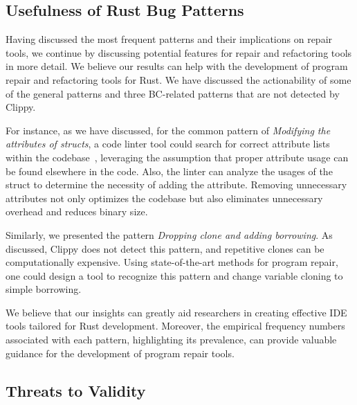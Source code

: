 \subsection{Usefulness of Rust Bug Patterns}

Having discussed the most frequent patterns and their implications on repair tools, we continue by discussing potential features for repair and refactoring tools in more detail. We believe our results can help with the development of program repair and refactoring tools for Rust. We have discussed the actionability of some of the general patterns and three BC-related patterns that are not detected by Clippy.

For instance, as we have discussed, for the common pattern of \textit{Modifying the attributes of structs}, a code linter tool could search for correct attribute lists within the codebase~\citep{forrest2009genetic}, leveraging the assumption that proper attribute usage can be found elsewhere in the code. Also, the linter can analyze the usages of the struct to determine the necessity of adding the attribute. Removing unnecessary attributes not only optimizes the codebase but also eliminates unnecessary overhead and reduces binary size.

Similarly, we presented the pattern \textit{Dropping clone and adding borrowing}. As discussed, Clippy does not detect this pattern, and repetitive clones can be computationally expensive. Using state-of-the-art methods for program repair, one could design a tool to recognize this pattern and change variable cloning to simple borrowing.

We believe that our insights can greatly aid researchers in creating effective IDE tools tailored for Rust development. Moreover, the empirical frequency numbers associated with each pattern, highlighting its prevalence, can provide valuable guidance for the development of program repair tools.



\subsection{Threats to Validity}

